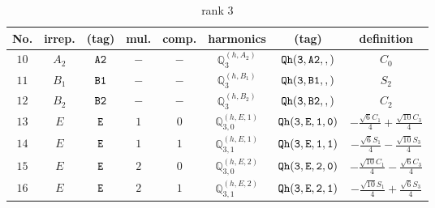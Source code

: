 \documentclass[fleqn,8pt]{jsarticle}
\begin{document}
\begin{table}[ht!]
\begin{center}
\caption{rank 3}
\renewcommand{\arraystretch}{1.3}
\begin{tabular}{cccccccc} \hline \hline
No. & irrep. & (tag) & mul. & comp. & harmonics & (tag) & definition \\ \hline
$ 10 $ & $ A_{2} $ & $ {\tt A2} $ & $ - $ & $ - $ & $ \mathbb{Q}_{3}^{(h,A_{2})} $ & $ {\tt Qh(3,A2,,)} $ & $ C_{0} $ \\
$ 11 $ & $ B_{1} $ & $ {\tt B1} $ & $ - $ & $ - $ & $ \mathbb{Q}_{3}^{(h,B_{1})} $ & $ {\tt Qh(3,B1,,)} $ & $ S_{2} $ \\
$ 12 $ & $ B_{2} $ & $ {\tt B2} $ & $ - $ & $ - $ & $ \mathbb{Q}_{3}^{(h,B_{2})} $ & $ {\tt Qh(3,B2,,)} $ & $ C_{2} $ \\
$ 13 $ & $ E $ & $ {\tt E} $ & $ 1 $ & $ 0 $ & $ \mathbb{Q}_{3,0}^{(h,E,1)} $ & $ {\tt Qh(3,E,1,0)} $ & $ - \frac{\sqrt{6} C_{1}}{4} + \frac{\sqrt{10} C_{3}}{4} $ \\
$ 14 $ & $ E $ & $ {\tt E} $ & $ 1 $ & $ 1 $ & $ \mathbb{Q}_{3,1}^{(h,E,1)} $ & $ {\tt Qh(3,E,1,1)} $ & $ - \frac{\sqrt{6} S_{1}}{4} - \frac{\sqrt{10} S_{3}}{4} $ \\
$ 15 $ & $ E $ & $ {\tt E} $ & $ 2 $ & $ 0 $ & $ \mathbb{Q}_{3,0}^{(h,E,2)} $ & $ {\tt Qh(3,E,2,0)} $ & $ - \frac{\sqrt{10} C_{1}}{4} - \frac{\sqrt{6} C_{3}}{4} $ \\
$ 16 $ & $ E $ & $ {\tt E} $ & $ 2 $ & $ 1 $ & $ \mathbb{Q}_{3,1}^{(h,E,2)} $ & $ {\tt Qh(3,E,2,1)} $ & $ - \frac{\sqrt{10} S_{1}}{4} + \frac{\sqrt{6} S_{3}}{4} $ \\
 \hline \hline
\end{tabular}
\end{center}
\end{table}
\end{document}
